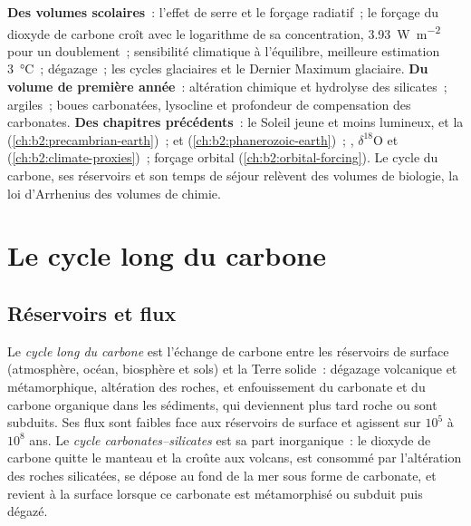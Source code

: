 \begin{recall}
\textbf{Des volumes scolaires}~: l'effet de serre et le forçage radiatif~; le forçage du
dioxyde de carbone croît avec le logarithme de sa concentration, \qty{3.93}{W.m^{-2}} pour un doublement~;
sensibilité climatique à l'équilibre, meilleure estimation \qty{3}{\celsius}~; dégazage~; les cycles glaciaires
et le Dernier Maximum glaciaire. \textbf{Du volume de première année}~: altération chimique et hydrolyse des silicates~;
argiles~; boues carbonatées, lysocline et profondeur de compensation des carbonates.
\textbf{Des chapitres précédents}~: le Soleil jeune et moins lumineux, et la 
(\cref{ch:b2:precambrian-earth})~;  et 
(\cref{ch:b2:phanerozoic-earth})~; , $\delta^{18}$O et 
(\cref{ch:b2:climate-proxies})~; forçage orbital (\cref{ch:b2:orbital-forcing}). Le cycle du carbone,
ses réservoirs et son temps de séjour relèvent des volumes de biologie, la loi d'Arrhenius des volumes de
chimie.
\end{recall}

\section{Le cycle long du carbone}\label{sec:b2:deep-time-climate:cycle}

\subsection*{Réservoirs et flux}

\begin{definition}\label{def:b2:deep-time-climate:carbon-cycle}
Le \emph{cycle long du carbone} est l'échange de carbone entre
les réservoirs de surface (atmosphère, océan, biosphère et sols) et la Terre solide~: dégazage volcanique et
métamorphique, altération des roches, et enfouissement du carbonate et du carbone organique dans
les sédiments, qui deviennent plus tard roche ou sont subduits. Ses flux sont faibles face aux
réservoirs de surface et agissent sur $10^5$ à $10^8$ ans. Le
\emph{cycle carbonates--silicates} est sa part inorganique~: le dioxyde de carbone quitte le manteau
et la croûte aux volcans, est consommé par l'altération des roches silicatées, se dépose au fond
de la mer sous forme de carbonate, et revient à la surface lorsque ce carbonate est métamorphisé ou
subduit puis dégazé.
\end{definition}

